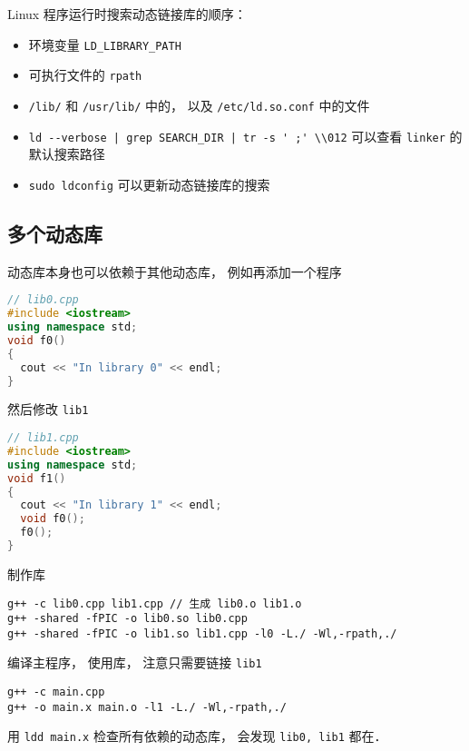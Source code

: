 Linux 程序运行时搜索动态链接库的顺序：
\begin{itemize}
\item 环境变量 \verb|LD_LIBRARY_PATH|
\item 可执行文件的 \verb|rpath|
\item \verb|/lib/| 和 \verb|/usr/lib/| 中的， 以及 \verb|/etc/ld.so.conf| 中的文件
\item \verb`ld --verbose | grep SEARCH_DIR | tr -s ' ;' \\012` 可以查看 \verb|linker| 的默认搜索路径
\item \verb|sudo ldconfig| 可以更新动态链接库的搜索
\end{itemize}

\subsection{多个动态库}
动态库本身也可以依赖于其他动态库， 例如再添加一个程序
\begin{lstlisting}[language=cpp]
// lib0.cpp
#include <iostream>
using namespace std;
void f0()
{
  cout << "In library 0" << endl;
}
\end{lstlisting}
然后修改 \verb|lib1|
\begin{lstlisting}[language=cpp]
// lib1.cpp
#include <iostream>
using namespace std;
void f1()
{
  cout << "In library 1" << endl;
  void f0();
  f0();
}
\end{lstlisting}
制作库
\begin{lstlisting}[language=none]
g++ -c lib0.cpp lib1.cpp // 生成 lib0.o lib1.o
g++ -shared -fPIC -o lib0.so lib0.cpp
g++ -shared -fPIC -o lib1.so lib1.cpp -l0 -L./ -Wl,-rpath,./
\end{lstlisting}
编译主程序， 使用库， 注意只需要链接 \verb|lib1|
\begin{lstlisting}[language=none]
g++ -c main.cpp
g++ -o main.x main.o -l1 -L./ -Wl,-rpath,./
\end{lstlisting}
用 \verb|ldd main.x| 检查所有依赖的动态库， 会发现 \verb|lib0, lib1| 都在．

